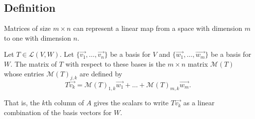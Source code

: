 \subsection{Definition}
Matrices of size $m \times n$ can represent a linear map from a space with dimension $m$ to one with dimension $n$.
\begin{definition}
	Let $T \in \mathcal{L}(V,W)$.
	Let $\{\vec{v_1}, \dots, \vec{v_n}\}$ be a basis for $V$ and $\{\vec{w_1}, \dots, \vec{w_m}\}$ be a basis for $W$.
	The matrix of $T$ with respect to these bases is the $m \times n$ matrix $\mathcal{M}(T)$ whose entries $\mathcal{M}(T)_{j,k}$ are defined by
	\begin{equation*}
		T\vec{v_k} = \mathcal{M}(T)_{1,k}\vec{w_1} + \dots + \mathcal{M}(T)_{m,k}\vec{w_m}.
	\end{equation*}
\end{definition}
That is, the $k$th column of $A$ gives the scalars to write $T\vec{v_k}$ as a linear combination of the basis vectors for $W$.


